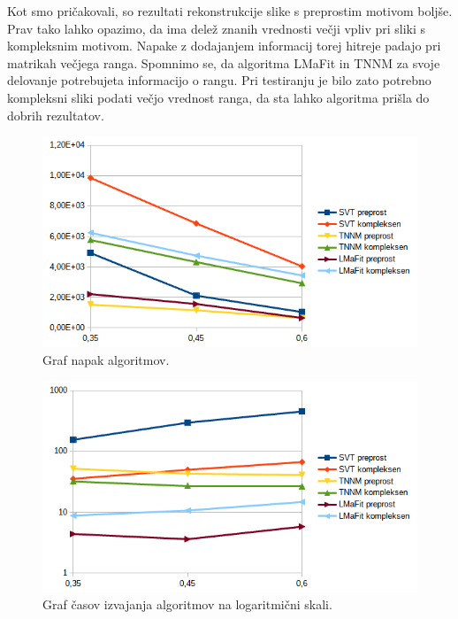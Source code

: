 Kot smo pričakovali, so rezultati rekonstrukcije slike s preprostim motivom boljše. Prav tako lahko opazimo, da ima delež znanih vrednosti večji vpliv pri sliki s kompleksnim motivom. Napake z dodajanjem informacij torej hitreje padajo pri matrikah večjega ranga. Spomnimo se, da algoritma LMaFit in TNNM za svoje delovanje potrebujeta informacijo o rangu. Pri testiranju je bilo zato potrebno kompleksni sliki podati večjo vrednost ranga, da sta lahko algoritma prišla do dobrih rezultatov. \FloatBarrier

\begin{figure}[!ht]
    \centering
    \includegraphics[width=\linewidth]{Poglavja/Slike/kompleksnost/kompleksna grayscale 300/kompleksnost.png}
    \caption{Graf napak algoritmov.}
\end{figure}

\begin{figure}[!ht]
    \centering
    \includegraphics[width=\linewidth]{Poglavja/Slike/kompleksnost/kompleksna grayscale 300/cas.png}
    \caption{Graf časov izvajanja algoritmov na logaritmični skali.}
\end{figure}


